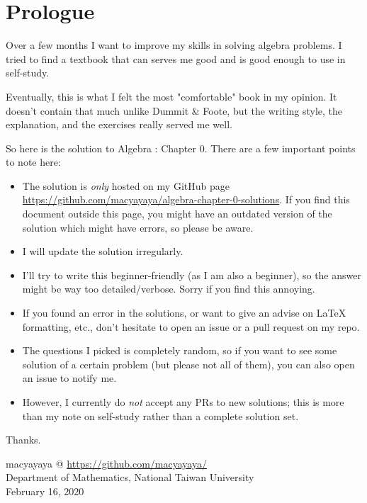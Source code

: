 \begin{center}
\end{center}
    
\newpage

\chapter{Prologue}
Over a few months I want to improve my skills in solving algebra problems. I tried to find a textbook that can serves me good and is good enough to use in self-study. 

Eventually, this is what I felt the most "comfortable" book in my opinion. It doesn't contain that much unlike Dummit \& Foote, but the writing style, the explanation, and the exercises really served me well.

So here is the solution to Algebra : Chapter 0. There are a few important points to note here:
\begin{itemize}
    \item The solution is \emph{only} hosted on my GitHub page \href{https://github.com/macyayaya/algebra-chapter-0-solutions}{https://github.com/macyayaya/algebra-chapter-0-solutions}. If you find this document outside this page, you might have an outdated version of the solution which might have errors, so please be aware.
    \item I will update the solution irregularly.
    \item I'll try to write this beginner-friendly (as I am also a beginner), so the answer might be way too detailed/verbose. Sorry if you find this annoying. 
    \item If you found an error in the solutions, or want to give an advise on LaTeX formatting, etc., don't hesitate to open an issue or a pull request on my repo. 
    \item The questions I picked is completely random, so if you want to see some solution of a certain problem (but please not all of them), you can also open an issue to notify me. 
    \item However, I currently do \emph{not} accept any PRs to new solutions; this is more than my note on self-study rather than a complete solution set.
\end{itemize}

Thanks. 

\begin{flushright}
macyayaya @ \href{https://github.com/macyayaya/}{https://github.com/macyayaya/} \\
Department of Mathematics, National Taiwan University \\
February 16, 2020
\end{flushright}
